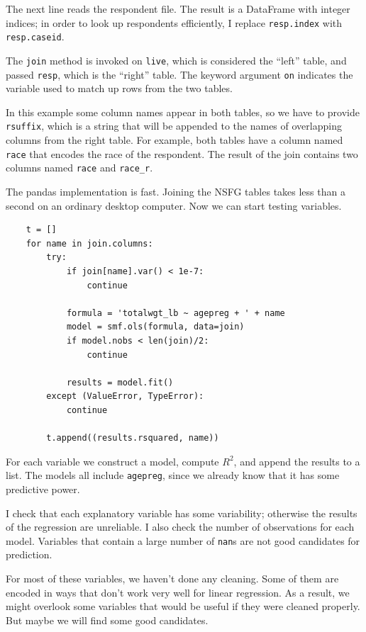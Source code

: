 \documentclass[12pt]{book}
\begin{document}
The next line reads the respondent file.  The result is a DataFrame
with integer indices; in order to look up respondents efficiently,
I replace {\tt resp.index} with {\tt resp.caseid}. 

The {\tt join} method is invoked on {\tt live}, which is considered
the ``left'' table, and passed {\tt resp}, which is the ``right'' table.
The keyword argument {\tt on} indicates the variable used to match up
rows from the two tables.

In this example some column names appear in both tables,
so we have to provide {\tt rsuffix}, which is a string that will be
appended to the names of overlapping columns from the right table.
For example, both tables have a column named {\tt race} that encodes
the race of the respondent.  The result of the join contains two
columns named {\tt race} and \verb"race_r".

The pandas implementation is fast.  Joining the NSFG tables takes
less than a second on an ordinary desktop computer.
Now we can start testing variables.

\begin{verbatim}
    t = []
    for name in join.columns:
        try:
            if join[name].var() < 1e-7:
                continue

            formula = 'totalwgt_lb ~ agepreg + ' + name
            model = smf.ols(formula, data=join)
            if model.nobs < len(join)/2:
                continue

            results = model.fit()
        except (ValueError, TypeError):
            continue

        t.append((results.rsquared, name))
\end{verbatim}

For each variable we construct a model, compute $R^2$, and append
the results to a list.  The models all include {\tt agepreg}, since
we already know that it has some predictive power.

I check that each explanatory variable has some variability; otherwise
the results of the regression are unreliable.  I also check the number
of observations for each model.  Variables that contain a large number
of {\tt nan}s are not good candidates for prediction.

For most of these variables, we haven't done any cleaning.  Some of them
are encoded in ways that don't work very well for linear regression.
As a result, we might overlook some variables that would be useful if
they were cleaned properly.  But maybe we will find some good candidates.
\end{document}
